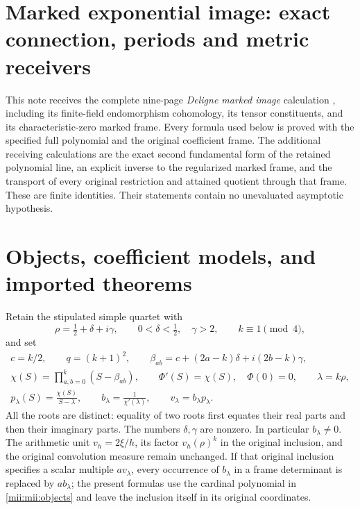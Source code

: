 \setcounter{equation}{0}
\renewcommand{\theequation}{MII.\arabic{equation}}
\section*{Marked exponential image: exact connection, periods and metric receivers}



This note receives the complete nine-page \emph{Deligne marked image} calculation
\cite{mii:received}, including its finite-field endomorphism cohomology, its tensor
constituents, and its characteristic-zero marked frame. Every formula used below
is proved with the specified full polynomial and the original coefficient frame.
The additional receiving calculations are the exact second fundamental form of
the retained polynomial line, an explicit inverse to the regularized marked
frame, and the transport of every original restriction and attained quotient
through that frame. These are finite identities. Their statements contain no
unevaluated asymptotic hypothesis.

\section{Objects, coefficient models, and imported theorems}
Retain the stipulated simple quartet with
\[
 \rho=\tfrac12+\delta+i\gamma,\qquad 0<\delta<\tfrac12,\quad\gamma>2,
 \qquad k\equiv1\pmod4,
\]
and set
\begin{equation}\tag{MII1}\label{mii:mii:objects}
 \begin{gathered}
 c=k/2,\qquad q=(k+1)^2,\qquad
 \beta_{ab}=c+(2a-k)\delta+i(2b-k)\gamma,\\
 \chi(S)=\prod_{a,b=0}^k(S-\beta_{ab}),\qquad
 \Phi'(S)=\chi(S),\quad\Phi(0)=0,\qquad\lambda=k\rho,\\
 p_\lambda(S)=\frac{\chi(S)}{S-\lambda},\qquad
 b_\lambda=\frac1{\chi'(\lambda)},\qquad v_\lambda=b_\lambda p_\lambda.
 \end{gathered}
\end{equation}
All the roots are distinct: equality of two roots first equates their real
parts and then their imaginary parts. The numbers $\delta,\gamma$ are nonzero.
In particular $b_\lambda\ne0$. The arithmetic unit $v_h=2\xi/h$, its factor
$v_h(\rho)^k$ in the original inclusion, and the original convolution measure
remain unchanged. If that original inclusion specifies a scalar multiple
$a v_\lambda$, every occurrence of $b_\lambda$ in a frame determinant is replaced
by $a b_\lambda$; the present formulas use the cardinal polynomial in
\eqref{mii:mii:objects} and leave the inclusion itself in its original coordinates.

